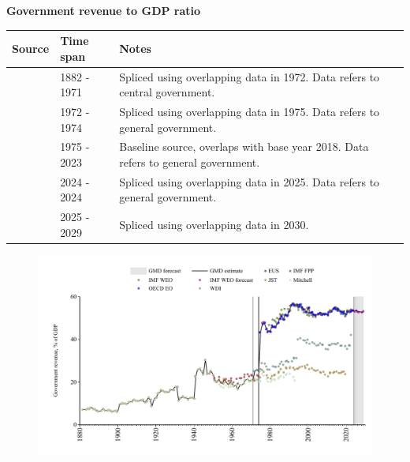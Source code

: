 \documentclass[12pt,a4paper,landscape]{article}
\begin{document}
\begin{adjustbox}{max totalsize={\paperwidth}{\paperheight},center}
\begin{minipage}[t][\textheight][t]{\textwidth}
\vspace*{0.5cm}
{}
\begin{center}
{\Large\bfseries Government revenue to GDP ratio}
\end{center}
\vspace{0.5cm}
\begin{table}[H]
\centering
\small
\begin{tabular}{|l|l|l|}
\hline
\textbf{Source} & \textbf{Time span} & \textbf{Notes} \\
\hline
\rowcolor{white}\cite{JST}& 1882 - 1971 &Spliced using overlapping data in 1972. Data refers to central government.\\
\rowcolor{lightgray}\cite{WDI}& 1972 - 1974 &Spliced using overlapping data in 1975. Data refers to general government.\\
\rowcolor{white}\cite{OECD_EO}& 1975 - 2023 &Baseline source, overlaps with base year 2018. Data refers to general government.\\
\rowcolor{lightgray}\cite{EUS}& 2024 - 2024 &Spliced using overlapping data in 2025. Data refers to general government.\\
\rowcolor{white}\cite{IMF_WEO_forecast}& 2025 - 2029 &Spliced using overlapping data in 2030. \\
\hline
\end{tabular}
\end{table}
\begin{figure}[H]
\centering
\includegraphics[width=\textwidth,height=0.6\textheight,keepaspectratio]{graphs/FIN_govrev_GDP.pdf}
\end{figure}
\end{minipage}
\end{adjustbox}
\end{document}
